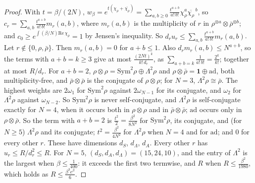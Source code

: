 \documentclass[11pt,a4paper]{article}
\theoremstyle{definition}
\theoremstyle{remark}
\begin{document}
\begin{proof}
With $t=\beta/(2N)$, $w_\beta=e^{t(\chi_\rho+\overline{\chi_\rho})}=\sum_{a,b\ge0}\frac{t^{a+b}}{a!\,b!}\chi_\rho^a\overline{\chi_\rho}^{\,b}$, so $c_r=\sum_{a,b}\frac{t^{a+b}}{a!\,b!}m_r(a,b)$, where
$m_r(a,b)$ is the multiplicity of $r$ in $\rho^{\otimes a}\otimes\bar\rho^{\otimes b}$; and $c_0\ge e^{\int(\beta/N)\mathrm{Re}\,\chi_\rho}=1$ by Jensen's inequality. So
$d_ru_r\le\sum_{a,b}\frac{t^{a+b}}{a!\,b!}m_r(a,b)$. Let $r\notin\{0,\rho,\bar\rho\}$. Then $m_r(a,b)=0$ for $a+b\le1$. Also $d_rm_r(a,b)\le N^{a+b}$, so the terms with $a+b=k\ge3$
give at most $\frac{(2Nt)^k}{k!\,d_r}$, as $\sum_{a+b=k}\frac1{a!\,b!}=\frac{2^k}{k!}$; together at most $R/d_r$. For $a+b=2$, $\rho\otimes\rho=\mathrm{Sym}^2\rho\oplus\Lambda^2\rho$ and
$\rho\otimes\bar\rho=\mathbf1\oplus\mathrm{ad}$, both multiplicity-free, and $\bar\rho\otimes\bar\rho$ is the conjugate of $\rho\otimes\rho$; for $N=3$, $\Lambda^2\rho\cong\bar\rho$. The highest weights are
$2\omega_1$ for $\mathrm{Sym}^2\rho$ against $2\omega_{N-1}$ for its conjugate, and $\omega_2$ for $\Lambda^2\rho$ against $\omega_{N-2}$. So $\mathrm{Sym}^2\rho$ is never self-conjugate, and $\Lambda^2\rho$ is
self-conjugate exactly for $N=4$, when it occurs both in $\rho\otimes\rho$ and in $\bar\rho\otimes\bar\rho$; $\mathrm{ad}$ occurs only in $\rho\otimes\bar\rho$. So the term with $a+b=2$ is
$\frac{t^2}2=\frac{\beta^2}{8N^2}$ for $\mathrm{Sym}^2\rho$, its conjugate, and (for $N\ge5$) $\Lambda^2\rho$ and its conjugate; $t^2=\frac{\beta^2}{4N^2}$ for $\Lambda^2\rho$ when $N=4$ and for $\mathrm{ad}$; and $0$
for every other $r$. These have dimensions $d_S$, $d_\Lambda$, $d_A$. Every other $r$ has $u_r\le R/d_r^2\le R$. For $N=5$, $(d_S,d_A,d_\Lambda)=(15,24,10)$, and the entry of $\Lambda^2$ is the largest
when $\beta\le\frac1{400}$: it exceeds the first two termwise, and $R$ when $R\le\frac{\beta^2}{1980}$, which holds as $R\le\frac{\beta^3e^\beta}6$.
\end{proof}
\end{document}
